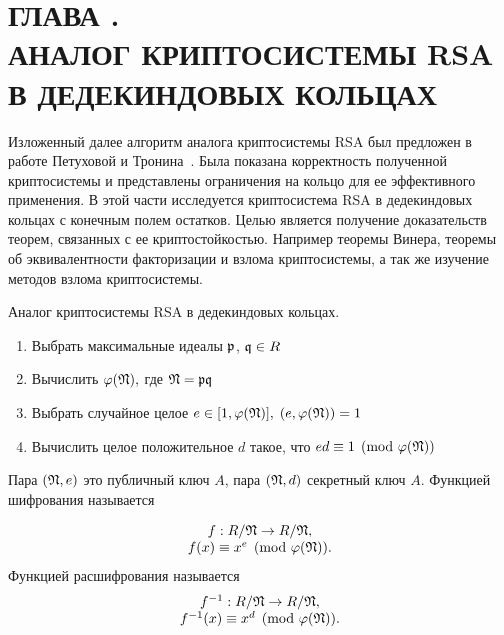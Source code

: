 \documentclass[_00_dissertation.tex]{subfiles}
\begin{document}
\onlyinsubfile{
    \renewcommand{\contentsname}{ОГЛАВЛЕНИЕ}
    \setcounter{tocdepth}{3}
    \tableofcontents
}

\chapter*{ГЛАВА .\\ АНАЛОГ КРИПТОСИСТЕМЫ RSA В ДЕДЕКИНДОВЫХ КОЛЬЦАХ}\label{chapter:RSA-cryptosystem}

Изложенный далее алгоритм аналога криптосистемы RSA был предложен в работе Петуховой и Тронина~\cite{source:Petukhova}.
Была показана корректность полученной криптосистемы и представлены ограничения  на кольцо для ее эффективного применения.
В этой части исследуется криптосистема RSA в дедекиндовых кольцах с конечным полем остатков.
Целью является получение доказательств теорем, связанных с ее криптостойкостью.
Например теоремы Винера, теоремы об эквивалентности факторизации и взлома криптосистемы, а так же изучение методов взлома криптосистемы.

\begin{algorithm}\label{algorithm:RSA_in_dedekind}
    Аналог криптосистемы RSA в дедекиндовых кольцах.

    \begin{enumerate}
        \item Выбрать максимальные идеалы $\mathfrak{p}$, $\mathfrak{q}\in R$

        \item Вычислить $\varphi(\mathfrak{N}),$ где $\mathfrak{N} = \mathfrak{p} \mathfrak{q}$

        \item Выбрать случайное целое $e \in [1, \varphi(\mathfrak{N})],$ $(e, \varphi(\mathfrak{N}))=1$

        \item Вычислить целое положительное $d$ такое, что $ed \equiv 1 \pmod{\varphi(\mathfrak{N})}$
    \end{enumerate}

    Пара $(\mathfrak{N}, e)$ это публичный ключ $A$, пара $(\mathfrak{N}, d)$ секретный ключ $A$.
    Функцией шифрования называется

    \begin{equation*}
        \begin{array}{c}
            f: R/\mathfrak{N} \to R/\mathfrak{N},\\
            f(x) \equiv x^{e} \pmod{\varphi(\mathfrak{N})}.
        \end{array}
    \end{equation*}
    Функцией расшифрования называется
    \begin{equation*}
        \begin{array}{c}
            f^{-1}: R/\mathfrak{N} \to R/\mathfrak{N},\\
            f^{-1}(x) \equiv x^{d}\pmod{\varphi(\mathfrak{N})}.
        \end{array}
    \end{equation*}
\end{algorithm}
\end{document}
